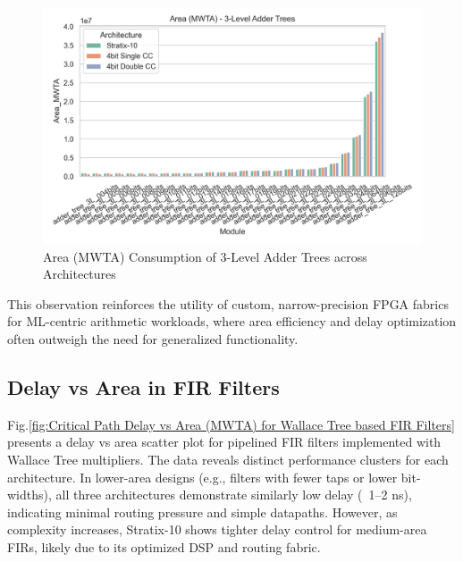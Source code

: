 \begin{figure}[H]
	\centerline{\includegraphics[scale = 0.75]{Figures/adder_trees_3lvl_area_bar_plt.png}}
	\caption{Area (MWTA) Consumption of 3-Level Adder Trees across Architectures}
	\label{fig:Area-(MWTA)-Consumption-of-3-Level-Adder-Trees-across-Architectures}
\end{figure}

This observation reinforces the utility of custom, narrow-precision FPGA fabrics for ML-centric arithmetic workloads, where area efficiency and delay optimization often outweigh the need for generalized functionality.

\subsection{Delay vs Area in FIR Filters}
Fig.\ref{fig:Critical Path Delay vs Area (MWTA) for Wallace Tree based FIR Filters} presents a delay vs area scatter plot for pipelined FIR filters implemented with Wallace Tree multipliers. The data reveals distinct performance clusters for each architecture. In lower-area designs (e.g., filters with fewer taps or lower bit-widths), all three architectures demonstrate similarly low delay (~1–2 ns), indicating minimal routing pressure and simple datapaths. However, as complexity increases, Stratix-10 shows tighter delay control for medium-area FIRs, likely due to its optimized DSP and routing fabric.

